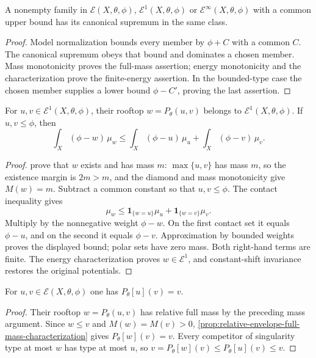 \begin{proposition}\label{prop:relative-energy-family-supremum}
A nonempty family in $\mathcal E(X,\theta,\phi)$, $\mathcal E^1(X,\theta,\phi)$ or $\mathcal E^\infty(X,\theta,\phi)$ with a common upper bound has its canonical supremum in the same class.
\end{proposition}
\begin{proof}
Model normalization bounds every member by $\phi+C$ with a common $C$. The canonical supremum obeys that bound and dominates a chosen member. Mass monotonicity proves the full-mass assertion; energy monotonicity and the characterization prove the finite-energy assertion. In the bounded-type case the chosen member supplies a lower bound $\phi-C'$, proving the last assertion.
\end{proof}

\begin{proposition}\label{prop:relative-finite-energy-rooftop-closure}
For $u,v\in\mathcal E^1(X,\theta,\phi)$, their rooftop $w=P_\theta(u,v)$ belongs to $\mathcal E^1(X,\theta,\phi)$. If $u,v\leq\phi$, then
\[
 \int_X(\phi-w)\,\mu_w
     \leq\int_X(\phi-u)\,\mu_u+\int_X(\phi-v)\,\mu_v.
\]
\end{proposition}
\begin{proof}
 prove that $w$ exists and has mass $m$: $\max\{u,v\}$ has mass $m$, so the existence margin is $2m>m$, and the diamond and mass monotonicity give $M(w)=m$. Subtract a common constant so that $u,v\leq\phi$. The contact inequality gives
\[
 \mu_w\leq\mathbf1_{\{w=u\}}\mu_u
                      +\mathbf1_{\{w=v\}}\mu_v.
\]
Multiply by the nonnegative weight $\phi-w$. On the first contact set it equals $\phi-u$, and on the second it equals $\phi-v$. Approximation by bounded weights proves the displayed bound; polar sets have zero mass. Both right-hand terms are finite. The energy characterization proves $w\in\mathcal E^1$, and constant-shift invariance restores the original potentials.
\end{proof}

\begin{corollary}\label{cor:mutual-full-mass-singularity-envelopes}
For $u,v\in\mathcal E(X,\theta,\phi)$ one has $P_\theta[u](v)=v$.
\end{corollary}
\begin{proof}
Their rooftop $w=P_\theta(u,v)$ has relative full mass by the preceding mass argument. Since $w\leq v$ and $M(w)=M(v)>0$, \cref{prop:relative-envelope-full-mass-characterization} gives $P_\theta[w](v)=v$. Every competitor of singularity type at most $w$ has type at most $u$, so
$v=P_\theta[w](v)\leq P_\theta[u](v)\leq v$.
\end{proof}

